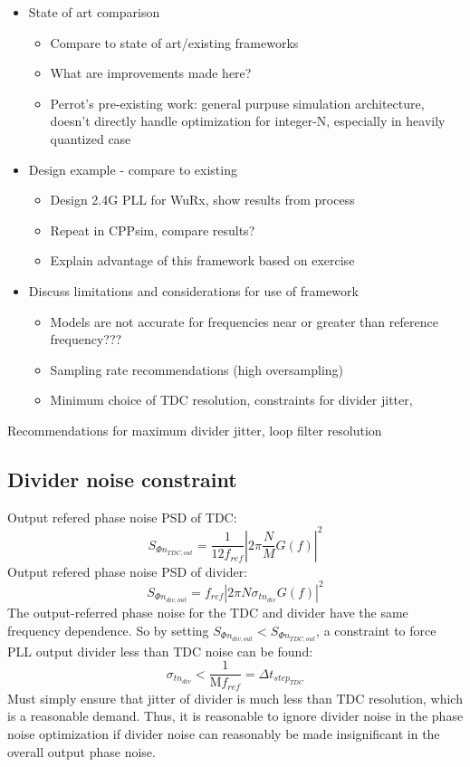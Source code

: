 \begin{itemize}
	\item State of art comparison
	\begin{itemize}
		\item Compare to state of art/existing frameworks
		\item What are improvements made here?
		\item Perrot's pre-existing work: general purpuse simulation architecture, doesn't directly handle optimization for integer-N, especially in heavily quantized case
	\end{itemize}
	\item Design example - compare to existing
	\begin{itemize}
		\item Design 2.4G PLL for WuRx, show results from process
		\item Repeat in CPPsim, compare results?
		\item Explain advantage of this framework based on exercise
	\end{itemize}
	\item Discuss limitations and considerations for use of framework
	\begin{itemize}
		\item Models are not accurate for frequencies near or greater than reference frequency???
		\item Sampling rate recommendations (high oversampling)
		\item Minimum choice of TDC resolution, constraints for divider jitter,
	\end{itemize}
\end{itemize}

	Recommendations for maximum divider jitter, loop filter resolution
	\subsection{Divider noise constraint}
		Output refered phase noise PSD of TDC:
		\begin{equation}
			S_{\Phi n_{TDC,out}} = \frac{1}{12 f_{ref}}\left|2\pi\frac{N}{M} G(f) \right|^2
		\end{equation}
		Output refered phase noise PSD of divider:
		\begin{equation}
			S_{\Phi n_{div, out}} = f_{ref} \left|2\pi N \sigma_{tn_{div}} G(f)\right|^2
		\end{equation}
		The output-referred phase noise for the TDC and divider have the same frequency dependence. So by setting $S_{\Phi n_{div, out}} < S_{\Phi n_{TDC,out}}$, a constraint to force PLL output divider less than TDC noise can be found:
		\begin{equation}
			\sigma_{tn_{div}} < \frac{1}{\mathrm{M}f_{ref}} = \Delta t_{step_{TDC}}
		\end{equation}
		Must simply ensure that jitter of divider is much less than TDC resolution, which is a reasonable demand. Thus, it is reasonable to ignore divider noise in the phase noise optimization if divider noise can reasonably be made insignificant in the overall output phase noise.

